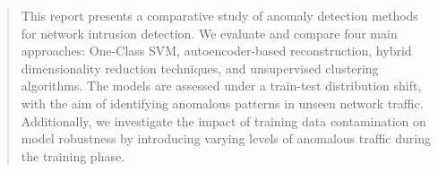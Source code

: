 
\begin{abstract}

This report presents a comparative study of anomaly detection methods for network intrusion detection.
We evaluate and compare four main approaches: One-Class SVM, autoencoder-based reconstruction, hybrid dimensionality reduction techniques, and unsupervised clustering algorithms.
The models are assessed under a train-test distribution shift, with the aim of identifying anomalous patterns in unseen network traffic.
Additionally, we investigate the impact of training data contamination on model robustness by introducing varying levels of anomalous traffic during the training phase.

\end{abstract}
